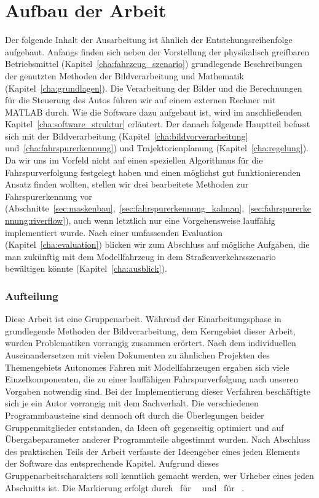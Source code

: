 \section{Aufbau der Arbeit \dcsecondauthorshort}

Der folgende Inhalt der Ausarbeitung ist ähnlich der Entstehungsreihenfolge aufgebaut. Anfangs finden sich neben der Vorstellung der physikalisch greifbaren Betriebsmittel (Kapitel~\ref{cha:fahrzeug_szenario}) grundlegende Beschreibungen der genutzten Methoden der Bildverarbeitung und Mathematik (Kapitel~\ref{cha:grundlagen}). Die Verarbeitung der Bilder und die Berechnungen für die Steuerung des Autos führen wir auf einem externen Rechner mit MATLAB durch. Wie die Software dazu aufgebaut ist, wird im anschließenden Kapitel~\ref{cha:software_struktur} erläutert. Der danach folgende Hauptteil befasst sich mit der Bildverarbeitung (Kapitel~\ref{cha:bildvorverarbeitung} und~\ref{cha:fahrspurerkennung}) und Trajektorienplanung (Kapitel~\ref{cha:regelung}). Da wir uns im Vorfeld nicht auf einen speziellen Algorithmus für die Fahrspurverfolgung festgelegt haben und einen möglichst gut funktionierenden Ansatz finden wollten, stellen wir drei bearbeitete Methoden zur Fahrspurerkennung vor (Abschnitte~\ref{sec:maskenbau},~\ref{sec:fahrspurerkennung_kalman},~\ref{sec:fahrspurerkennung:riverflow}), auch wenn letztlich nur eine Vorgehensweise lauffähig implementiert wurde. Nach einer umfassenden Evaluation (Kapitel~\ref{cha:evaluation}) blicken wir zum Abschluss auf mögliche Aufgaben, die man zukünftig mit dem Modellfahrzeug in dem Straßenverkehrsszenario bewältigen könnte (Kapitel~\ref{cha:ausblick}).

\subsubsection{Aufteilung}

Diese Arbeit ist eine Gruppenarbeit.
Während der Einarbeitungsphase in grundlegende Methoden der Bildverarbeitung, dem Kerngebiet dieser Arbeit, wurden Problematiken vorrangig zusammen erörtert. Nach dem individuellen Auseinandersetzen mit vielen Dokumenten zu ähnlichen Projekten des Themengebiets \glqq Autonomes Fahren mit Modellfahrzeugen\grqq{} ergaben sich viele Einzelkomponenten, die zu einer lauffähigen Fahrspurverfolgung nach unseren Vorgaben notwendig sind. Bei der Implementierung dieser Verfahren beschäftigte sich je ein Autor vorrangig mit dem Sachverhalt. Die verschiedenen Programmbausteine sind dennoch oft durch die Überlegungen beider Gruppenmitglieder entstanden, da Ideen oft gegenseitig optimiert und auf Übergabeparameter anderer Programmteile abgestimmt wurden. Nach Abschluss des praktischen Teils der Arbeit verfasste der Ideengeber eines jeden Elements der Software das entsprechende Kapitel.   
Aufgrund dieses Gruppenarbeitscharakters soll kenntlich gemacht werden, wer Urheber eines jeden Abschnitts ist. Die Markierung erfolgt durch \dcfirstauthorshort\ für \dcfirstauthorfirstname\ \dcfirstauthorlastname\  und \dcsecondauthorshort\  für \dcsecondauthorfirstname\ \dcsecondauthorlastname{}.


